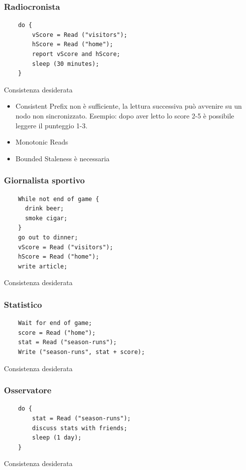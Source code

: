 \begin{frame}[fragile]
 \frametitle{Radiocronista}
  \begin{lstlisting}
    do {
        vScore = Read ("visitors");
        hScore = Read ("home");
        report vScore and hScore;
        sleep (30 minutes);
    }
  \end{lstlisting}
  \begin{block}{Consistenza desiderata}
    \begin{itemize}
      \item Consistent Prefix non è sufficiente, la lettura successiva può avvenire su un nodo non sincronizzato.
      Esempio: dopo aver letto lo score 2-5  è possibile leggere il punteggio 1-3.
      \item Monotonic Reads 
      \item Bounded Staleness è necessaria 
    \end{itemize}
  \end{block}
\end{frame}

\begin{frame}[fragile]
 \frametitle{Giornalista sportivo}
  \begin{lstlisting}
    While not end of game {
      drink beer;
      smoke cigar;
    }
    go out to dinner;
    vScore = Read ("visitors");
    hScore = Read ("home");
    write article;
  \end{lstlisting}
  \begin{block}{Consistenza desiderata}
    
  \end{block}
\end{frame}

\begin{frame}[fragile]
 \frametitle{Statistico}
  \begin{lstlisting}
    Wait for end of game;
    score = Read ("home");
    stat = Read ("season-runs");
    Write ("season-runs", stat + score);
  \end{lstlisting}
  \begin{block}{Consistenza desiderata}
   
   \end{block}
\end{frame}

\begin{frame}[fragile]
 \frametitle{Osservatore}
  \begin{lstlisting}
    do {
        stat = Read ("season-runs");
        discuss stats with friends;
        sleep (1 day);
    }
  \end{lstlisting}
  \begin{block}{Consistenza desiderata}
   
  \end{block}
\end{frame}